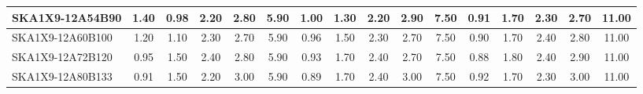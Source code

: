 \begin{table}[H]
{{\begin{tabular}{|lccccc||ccccc||ccccc|}
SKA1X9-12A54B90 & 1.40 \cellcolor{blue!52.88} & 0.98 \cellcolor{red!18.00} & 2.20 \cellcolor{green!32.00} & 2.80 \cellcolor{orange!39.00} & 5.90 \cellcolor{purple!60.00} & 1.00 \cellcolor{blue!27.06} & 1.30 \cellcolor{red!18.00} & 2.20 \cellcolor{green!18.00} & 2.90 \cellcolor{orange!49.50} & 7.50 \cellcolor{purple!60.00} & 0.91 \cellcolor{blue!20.42} & 1.70 \cellcolor{red!39.00} & 2.30 \cellcolor{green!39.00} & 2.70 \cellcolor{orange!28.50} & 11.00 \cellcolor{purple!60.00}\\ \hline 
SKA1X9-12A60B100 & 1.20 \cellcolor{blue!38.64} & 1.10 \cellcolor{red!26.13} & 2.30 \cellcolor{green!46.00} & 2.70 \cellcolor{orange!28.50} & 5.90 \cellcolor{purple!60.00} & 0.96 \cellcolor{blue!23.76} & 1.50 \cellcolor{red!39.00} & 2.30 \cellcolor{green!39.00} & 2.70 \cellcolor{orange!28.50} & 7.50 \cellcolor{purple!60.00} & 0.90 \cellcolor{blue!19.62} & 1.70 \cellcolor{red!39.00} & 2.40 \cellcolor{green!60.00} & 2.80 \cellcolor{orange!39.00} & 11.00 \cellcolor{purple!60.00}\\ \hline 
SKA1X9-12A72B120 & 0.95 \cellcolor{blue!20.85} & 1.50 \cellcolor{red!53.23} & 2.40 \cellcolor{green!60.00} & 2.80 \cellcolor{orange!39.00} & 5.90 \cellcolor{purple!60.00} & 0.93 \cellcolor{blue!21.29} & 1.70 \cellcolor{red!60.00} & 2.40 \cellcolor{green!60.00} & 2.70 \cellcolor{orange!28.50} & 7.50 \cellcolor{purple!60.00} & 0.88 \cellcolor{blue!18.00} & 1.80 \cellcolor{red!60.00} & 2.40 \cellcolor{green!60.00} & 2.90 \cellcolor{orange!49.50} & 11.00 \cellcolor{purple!60.00}\\ \hline 
SKA1X9-12A80B133 & 0.91 \cellcolor{blue!18.00} & 1.50 \cellcolor{red!53.23} & 2.20 \cellcolor{green!32.00} & 3.00 \cellcolor{orange!60.00} & 5.90 \cellcolor{purple!60.00} & 0.89 \cellcolor{blue!18.00} & 1.70 \cellcolor{red!60.00} & 2.40 \cellcolor{green!60.00} & 3.00 \cellcolor{orange!60.00} & 7.50 \cellcolor{purple!60.00} & 0.92 \cellcolor{blue!21.23} & 1.70 \cellcolor{red!39.00} & 2.30 \cellcolor{green!39.00} & 3.00 \cellcolor{orange!60.00} & 11.00 \cellcolor{purple!60.00}\\ \hline 
\end{tabular}}
\vspace{-0.300000cm}
\hspace{1cm} 
}
\end{table}
